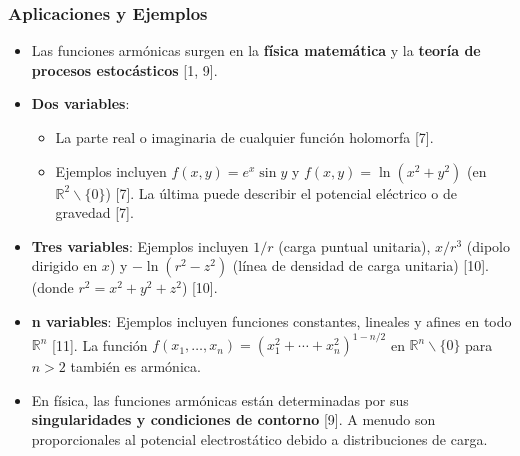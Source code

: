 \documentclass{beamer}
\begin{document}
\begin{frame}
  \frametitle{Aplicaciones y Ejemplos}

  \begin{itemize}
          \small
    \item Las funciones armónicas surgen en la \textbf{física matemática} y la \textbf{teoría de procesos estocásticos} [1, 9].
    \item \textbf{Dos variables}:
    \begin{itemize}
            \small
        \item La parte real o imaginaria de cualquier función holomorfa [7].
        \item Ejemplos incluyen $f(x, y) = e^x \sin y$ y $f(x, y) = \ln(x^2+y^2)$ (en $\mathbb{R}^2 \smallsetminus \{0\}$) [7]. La última puede describir el potencial eléctrico o de gravedad [7].
    \end{itemize}
    \item \textbf{Tres variables}: Ejemplos incluyen $1/r$ (carga puntual unitaria), $x/r^3$ (dipolo dirigido en $x$) y $-\ln(r^2-z^2)$ (línea de densidad de carga unitaria) [10]. (donde $r^2 = x^2+y^2+z^2$) [10].
    \item \textbf{n variables}: Ejemplos incluyen funciones constantes, lineales y afines en todo $\mathbb{R}^n$ [11]. La función $f(x_1, \dots, x_n) = (x_1^2 + \cdots + x_n^2)^{1-n/2}$ en $\mathbb{R}^n \smallsetminus \{0\}$ para $n>2$ también es armónica.
    \item En física, las funciones armónicas están determinadas por sus \textbf{singularidades y condiciones de contorno} [9]. A menudo son proporcionales al potencial electrostático debido a distribuciones de carga.
  \end{itemize}
\end{frame}
\end{document}
